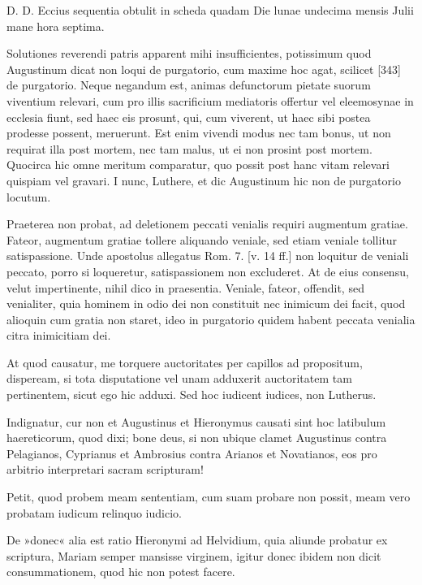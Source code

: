 D. D. Eccius sequentia obtulit in scheda quadam Die lunae undecima mensis Julii mane hora septima.

Solutiones reverendi patris apparent mihi insufficientes, potissimum quod Augustinum dicat non loqui de purgatorio, cum maxime hoc agat, scilicet [343] de purgatorio. Neque negandum est, animas defunctorum pietate suorum viventium relevari, cum pro illis sacrificium mediatoris offertur vel eleemosynae in ecclesia fiunt, sed haec eis prosunt, qui, cum viverent, ut haec sibi postea prodesse possent, meruerunt. Est enim vivendi modus nec tam bonus, ut non requirat illa post mortem, nec tam malus, ut ei non prosint post mortem. Quocirca hic omne meritum comparatur, quo possit post hanc vitam relevari quispiam vel gravari. I nunc, Luthere, et dic Augustinum hic non de purgatorio locutum.

Praeterea non probat, ad deletionem peccati venialis requiri augmentum gratiae. Fateor, augmentum gratiae tollere aliquando veniale, sed etiam veniale tollitur satispassione. Unde apostolus allegatus Rom. 7. [v. 14 ff.] non loquitur de veniali peccato, porro si loqueretur, satispassionem non excluderet. At de eius consensu, velut impertinente, nihil dico in praesentia. Veniale, fateor, offendit, sed venialiter, quia hominem in odio dei non constituit nec inimicum dei facit, quod alioquin cum gratia non staret, ideo in purgatorio quidem habent peccata venialia citra inimicitiam dei.

At quod causatur, me torquere auctoritates per capillos ad propositum, dispeream, si tota disputatione vel unam adduxerit auctoritatem tam pertinentem, sicut ego hic adduxi. Sed hoc iudicent iudices, non Lutherus.

Indignatur, cur non et Augustinus et Hieronymus causati sint hoc latibulum haereticorum, quod dixi; bone deus, si non ubique clamet Augustinus contra Pelagianos, Cyprianus et Ambrosius contra Arianos et Novatianos, eos pro arbitrio interpretari sacram scripturam!

Petit, quod probem meam sententiam, cum suam probare non possit, meam vero probatam iudicum relinquo iudicio.

De »donec« alia est ratio Hieronymi ad Helvidium, quia aliunde probatur ex scriptura, Mariam semper mansisse virginem, igitur donec ibidem non dicit consummationem, quod hic non potest facere.

